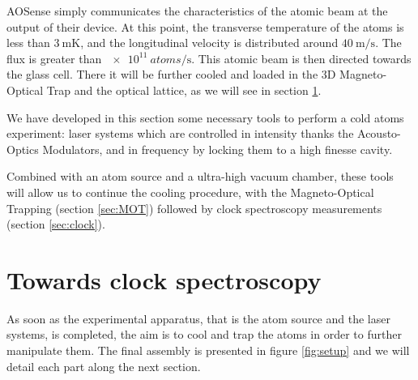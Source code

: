 \documentclass[11pt]{article}
\newenvironment{myblock}[1]{%
    \tcolorbox[%
    colback=color1,colframe=color1,%
    title=#1]}%
    {\endtcolorbox}
\numberwithin{equation}{section}
\numberwithin{figure}{section}
\begin{document}
AOSense simply communicates the characteristics of the atomic beam at the output of their device. At this point, the transverse temperature of the atoms is less than $\SI{3}{\milli\kelvin}$, and the longitudinal velocity is distributed around $\SI{40}{\metre\per\second}$. The flux is greater than $\SI{e11}{atoms\per\second}$. This atomic beam is then directed towards the glass cell. There it will be further cooled and loaded in the 3D Magneto-Optical Trap and the optical lattice, as we will see in section \ref{sec:clock_spectroscopy}. 

\vspace{0.5cm}

\begin{myblock}{}
We have developed in this section some necessary tools to perform a cold atoms experiment: laser systems which are controlled in intensity thanks the Acousto-Optics Modulators, and in frequency by locking them to a high finesse cavity.

Combined with an atom source and a ultra-high vacuum chamber, these tools will allow us to continue the cooling procedure, with the Magneto-Optical Trapping (section \ref{sec:MOT}) followed by clock spectroscopy measurements (section \ref{sec:clock}).
\end{myblock}

\newpage

\section{Towards clock spectroscopy}
\label{sec:clock_spectroscopy}

As soon as the experimental apparatus, that is the atom source and the laser systems, is completed, the aim is to cool and trap the atoms in order to further manipulate them. The final assembly is presented in figure \ref{fig:setup} and we will detail each part along the next section. 
\end{document}
